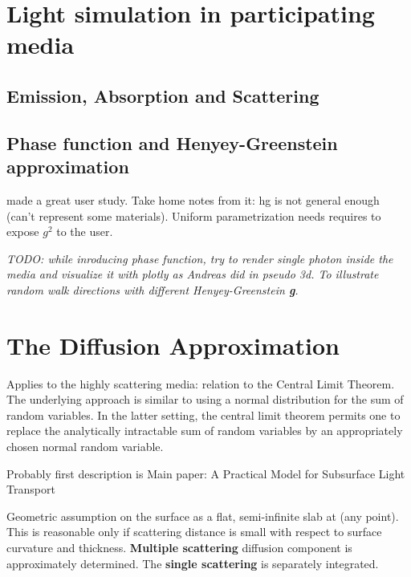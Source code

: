 \section{Light simulation in participating media}
\label{section:light_simulation_theory}
\subsection{Emission, Absorption and Scattering}

\subsection{Phase function and Henyey-Greenstein approximation}
\label{section:phasefunction}
\cite{Gkioulekas:2013:IVR:2508363.2508377} made a great user study.
Take home notes from it: \gls{hg} is not general enough (can't represent some
materials). Uniform parametrization needs requires to expose $g^2$ to the user.

\emph{TODO: while inroducing phase function, try to render single photon inside
the media and visualize it with plotly as Andreas did in pseudo 3d. To illustrate
random walk directions with different Henyey-Greenstein \textbf{g}.}

\section{The Diffusion Approximation}
Applies to the highly scattering media: relation to the Central Limit Theorem.
The underlying approach is similar to using a normal distribution for the sum of
random variables.
In the latter setting, the central limit theorem permits one to replace the analytically intractable sum of random variables by
an appropriately chosen normal random variable.

Probably first description is \cite{Stam1995}
Main paper: A Practical Model for Subsurface Light Transport \cite{Jensen:2001:PMS:383259.383319}

Geometric assumption on the surface as a flat, semi-infinite slab at (any
point). This is reasonable only if scattering distance is small with respect to
surface curvature and thickness. \textbf{Multiple scattering} diffusion
component is approximately determined. The \textbf{single scattering} is
separately integrated.
